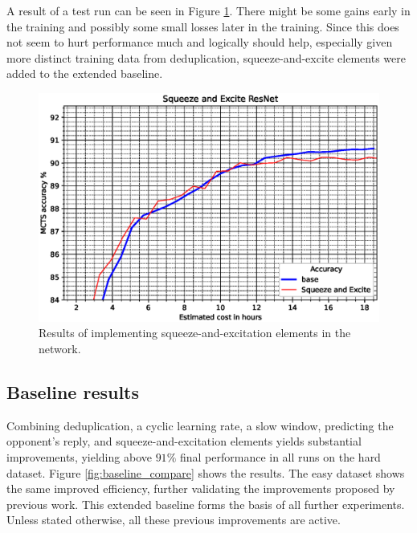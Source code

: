 \documentclass[12pt,onecolumn,oneside,titlepage]{article}
\begin{document}
A result of a test run can be seen in Figure \ref{fig:sqnet}. 
There might be some gains early in the training and possibly some small losses later in the training.
Since this does not seem to hurt performance much and logically should help, especially given more distinct training data from deduplication, squeeze-and-excite elements were added to the extended baseline.

\begin{figure}[H]
\centering
\includegraphics[clip,width=\columnwidth]{sqnet}
\caption{Results of implementing squeeze-and-excitation elements in the network.}
\label{fig:sqnet}
\end{figure}


\subsection{Baseline results}

Combining deduplication, a cyclic learning rate, a slow window, predicting the opponent's reply, and squeeze-and-excitation elements yields substantial improvements,
yielding above $91\%$ final performance in all runs on the hard dataset. Figure \ref{fig:baseline_compare} shows the results.
The easy dataset shows the same improved efficiency, further validating the improvements proposed by previous work.
This extended baseline forms the basis of all further experiments. Unless stated otherwise, all these previous improvements are active.
\end{document}
